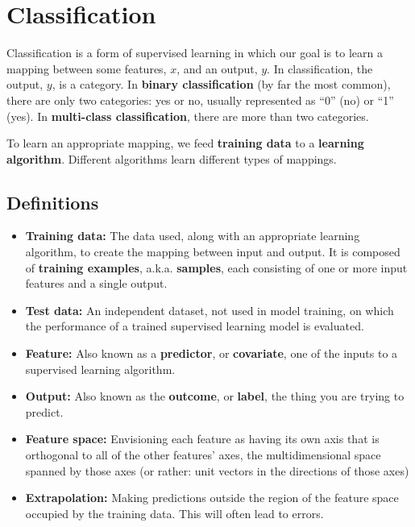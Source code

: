 \chapter{Classification \label{chapter:classification}}

Classification is a form of supervised learning in which our goal is to learn a mapping between some features, $x$, and an output, $y$. In classification, the output, $y$, is a category. In \textbf{binary classification} (by far the most common), there are only two categories: yes or no, usually represented as ``0'' (no) or ``1'' (yes). In \textbf{multi-class classification}, there are more than two categories.

To learn an appropriate mapping, we feed \textbf{training data} to a \textbf{learning algorithm}. Different algorithms learn different types of mappings.

\section{Definitions}

\begin{itemize}
\item \textbf{Training data:} The data used, along with an appropriate learning algorithm, to create the mapping between input and output. It is composed of \textbf{training examples}, a.k.a. \textbf{samples}, each consisting of one or more input features and a single output.
\item \textbf{Test data:} An independent dataset, not used in model training, on which the performance of a trained supervised learning model is evaluated. 
\item \textbf{Feature:} Also known as a \textbf{predictor}, or \textbf{covariate}, one of the inputs to a supervised learning algorithm.
\item \textbf{Output:} Also known as the \textbf{outcome}, or \textbf{label}, the thing you are trying to predict.
\item \textbf{Feature space:} Envisioning each feature as having its own axis that is orthogonal to all of the other features' axes, the multidimensional space spanned by those axes (or rather: unit vectors in the directions of those axes)
\item \textbf{Extrapolation:} Making predictions outside the region of the feature space occupied by the training data. This will often lead to errors. 
\end{itemize}

